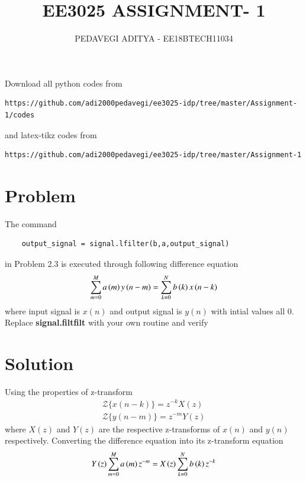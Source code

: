 \documentclass[journal,12pt,twocolumn]{IEEEtran}
\begin{document}
     \def\rightbox#1{\makebox[0in][r]{#1}}
     \def\centbox#1{\makebox[0in]{#1}}
     \def\topbox#1{\raisebox{-\baselineskip}[0in][0in]{#1}}
     \def\midbox#1{\raisebox{-0.5\baselineskip}[0in][0in]{#1}}
\vspace{3cm}
\title{EE3025 ASSIGNMENT- 1}
\author{PEDAVEGI ADITYA - EE18BTECH11034}
\maketitle
\newpage
\bigskip
\renewcommand{\thefigure}{\theenumi}
\renewcommand{\thetable}{\theenumi}
Download all python codes from 
\begin{lstlisting}
https://github.com/adi2000pedavegi/ee3025-idp/tree/master/Assignment-1/codes
\end{lstlisting}
%
and latex-tikz codes from 
%
\begin{lstlisting}
https://github.com/adi2000pedavegi/ee3025-idp/tree/master/Assignment-1
\end{lstlisting}

\section{Problem}

    
The command
\begin{lstlisting}
    output_signal = signal.lfilter(b,a,output_signal)
\end{lstlisting}

in Problem 2.3 is executed through following difference equation 
    \begin{align}
        \sum _{m=0}^{M}a\left(m\right)y\left(n-m\right)=\sum _{k=0}^{N}b\left(k\right)x\left(n-k\right)
    \end{align}
 where input signal is $x(n)$ and output signal is $y(n)$ with intial values all 0. Replace \textbf{signal.filtfilt} with your own routine and verify
  \section{Solution}
  Using the properties of z-transform
  \begin{align}
      {\mathcal {Z}}\{x(n-k)\} = z^{-k}X(z) \\
      {\mathcal {Z}}\{y(n-m)\} = z^{-m}Y(z)
  \end{align}
  where $X(z)$ and $Y(z)$ are the respective z-transforms of $x(n)$ and $y(n)$ respectively.
\newline
Converting the difference equation into its z-transform equation
\begin{align}
     Y\left(z\right) \sum _{m=0}^{M}a\left(m\right) z^{-m} = X\left(z\right) \sum _{k=0}^{N}b\left(k\right)z^{-k}
\end{align}
\end{document}
